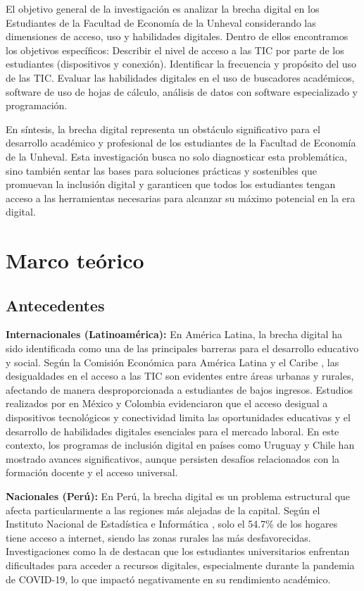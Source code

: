 \documentclass[12pt, a4paper]{article}
\begin{document}
El objetivo general de la investigación es analizar la brecha digital en los Estudiantes de la Facultad de Economía de la Unheval considerando las dimensiones de acceso, uso y habilidades digitales. Dentro de ellos encontramos los objetivos específicos: Describir el nivel de acceso a las TIC por parte de los estudiantes (dispositivos y conexión). Identificar la frecuencia y propósito del uso de las TIC. Evaluar las habilidades digitales en el uso de buscadores académicos, software de uso de hojas de cálculo, análisis de datos con software especializado y programación.

En síntesis, la brecha digital representa un obstáculo significativo para el desarrollo académico y profesional de los estudiantes de la Facultad de Economía de la Unheval. Esta investigación busca no solo diagnosticar esta problemática, sino también sentar las bases para soluciones prácticas y sostenibles que promuevan la inclusión digital y garanticen que todos los estudiantes tengan acceso a las herramientas necesarias para alcanzar su máximo potencial en la era digital.

\section{Marco teórico}
\subsection{Antecedentes}

\textbf{Internacionales (Latinoamérica):} En América Latina, la brecha digital ha sido identificada como una de las principales barreras para el desarrollo educativo y social. Según la Comisión Económica para América Latina y el Caribe \parencite{cepal2020}, las desigualdades en el acceso a las TIC son evidentes entre áreas urbanas y rurales, afectando de manera desproporcionada a estudiantes de bajos ingresos. Estudios realizados por \textcite{sanchez2021} en México y Colombia evidenciaron que el acceso desigual a dispositivos tecnológicos y conectividad limita las oportunidades educativas y el desarrollo de habilidades digitales esenciales para el mercado laboral. En este contexto, los programas de inclusión digital en países como Uruguay y Chile han mostrado avances significativos, aunque persisten desafíos relacionados con la formación docente y el acceso universal.

\textbf{Nacionales (Perú):} En Perú, la brecha digital es un problema estructural que afecta particularmente a las regiones más alejadas de la capital. Según el Instituto Nacional de Estadística e Informática \parencite{inei2022}, solo el 54.7\% de los hogares tiene acceso a internet, siendo las zonas rurales las más desfavorecidas. Investigaciones como la de \textcite{vasquez2021} destacan que los estudiantes universitarios enfrentan dificultades para acceder a recursos digitales, especialmente durante la pandemia de COVID-19, lo que impactó negativamente en su rendimiento académico.
\end{document}
